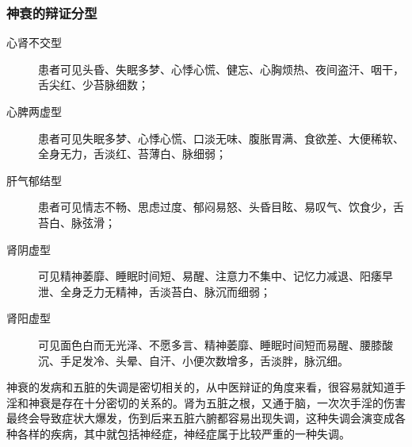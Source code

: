 \subsubsection{神衰的辩证分型}

\begin{description}
    \item[心肾不交型] 患者可见头昏、失眠多梦、心悸心慌、健忘、心胸烦热、夜间盗汗、咽干，舌尖红、少苔脉细数；
    \item[心脾两虚型] 患者可见失眠多梦、心悸心慌、口淡无味、腹胀胃满、食欲差、大便稀软、全身无力，舌淡红、苔薄白、脉细弱；
    \item[肝气郁结型] 患者可见情志不畅、思虑过度、郁闷易怒、头昏目眩、易叹气、饮食少，舌苔白、脉弦滑；
    \item[肾阴虚型] 可见精神萎靡、睡眠时间短、易醒、注意力不集中、记忆力减退、阳痿早泄、全身乏力无精神，舌淡苔白、脉沉而细弱；
    \item[肾阳虚型] 可见面色白而无光泽、不愿多言、精神萎靡、睡眠时间短而易醒、腰膝酸沉、手足发冷、头晕、自汗、小便次数增多，舌淡胖，脉沉细。
\end{description}

神衰的发病和五脏的失调是密切相关的，从中医辩证的角度来看，很容易就知道手淫和神衰是存在十分密切的关系的。肾为五脏之根，又通于脑，一次次手淫的伤害最终会导致症状大爆发，伤到后来五脏六腑都容易出现失调，这种失调会演变成各种各样的疾病，其中就包括神经症，神经症属于比较严重的一种失调。

